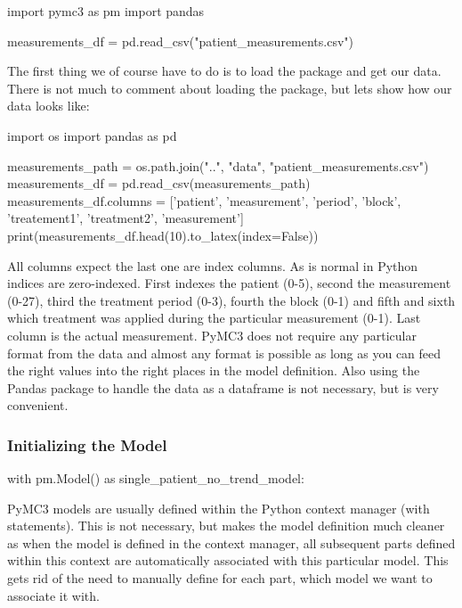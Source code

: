 \documentclass[12pt,a4paper,leqno]{report}
\theoremstyle{plain}
\theoremstyle{definition}
\theoremstyle{remark}
\begin{document}
\bigskip
\begin{pyverbatim}
import pymc3 as pm
import pandas

measurements_df = pd.read_csv("patient_measurements.csv")
\end{pyverbatim}
\bigskip

The first thing we of course have to do is to load the package and get our data. There is
not much to comment about loading the package, but lets show how our data looks like:

\bigskip
\begin{pycode}
import os
import pandas as pd

measurements_path = os.path.join("..", "data", "patient_measurements.csv")
measurements_df = pd.read_csv(measurements_path)
measurements_df.columns = ['patient', 'measurement', 'period', 'block',
'treatement1', 'treatment2', 'measurement']
print(measurements_df.head(10).to_latex(index=False))
\end{pycode}
\bigskip

All columns expect the last one are index columns. As is normal in Python indices are
zero-indexed. First indexes the patient (0-5), second the
measurement (0-27), third the treatment period (0-3), fourth the block (0-1) and fifth
and sixth which treatment was applied during the particular measurement (0-1). Last
column is the actual measurement. PyMC3 does not require any particular format from the
data and almost any format is possible as long as you can feed the right values into
the right places in the model definition. Also using the Pandas package to handle the
data as a dataframe is not necessary, but is very convenient.

\subsubsection{Initializing the Model}

\bigskip
\begin{pyverbatim}
with pm.Model() as single_patient_no_trend_model:
\end{pyverbatim}
\bigskip

PyMC3 models are usually defined within the Python context manager (with statements).
This is not necessary, but makes the model definition much cleaner as when the model is
defined in the context manager, all subsequent parts defined within this context are
automatically associated with this particular model. This gets rid of the need to
manually define for each part, which model we want to associate it with.
\end{document}
